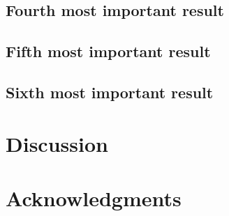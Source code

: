 \documentclass[11pt,letterpaper]{article}
\begin{document}
\subsection*{Fourth most important result}
\label{sec:org9b987a2}



\subsection*{Fifth most important result}
\label{sec:orgc47b33c}



\subsection*{Sixth most important result}
\label{sec:org42ebf0a}


\section*{Discussion}
\label{sec:org470b09c}


\section*{Acknowledgments}
\label{sec:orgc2e3523}
\end{document}
